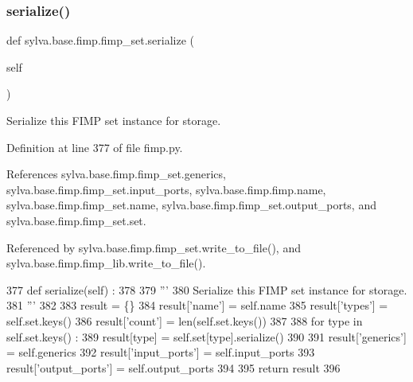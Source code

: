 \subsubsection{\texorpdfstring{serialize()}{serialize()}}
{\footnotesize\ttfamily def sylva.\+base.\+fimp.\+fimp\+\_\+set.\+serialize (\begin{DoxyParamCaption}\item[{}]{self }\end{DoxyParamCaption})}

\begin{DoxyVerb}  Serialize this FIMP set instance for storage.
\end{DoxyVerb}
 

Definition at line 377 of file fimp.\+py.



References sylva.\+base.\+fimp.\+fimp\+\_\+set.\+generics, sylva.\+base.\+fimp.\+fimp\+\_\+set.\+input\+\_\+ports, sylva.\+base.\+fimp.\+fimp.\+name, sylva.\+base.\+fimp.\+fimp\+\_\+set.\+name, sylva.\+base.\+fimp.\+fimp\+\_\+set.\+output\+\_\+ports, and sylva.\+base.\+fimp.\+fimp\+\_\+set.\+set.



Referenced by sylva.\+base.\+fimp.\+fimp\+\_\+set.\+write\+\_\+to\+\_\+file(), and sylva.\+base.\+fimp.\+fimp\+\_\+lib.\+write\+\_\+to\+\_\+file().


\begin{DoxyCode}
377     \textcolor{keyword}{def }serialize(self) :
378 
379       \textcolor{stringliteral}{'''}
380 \textcolor{stringliteral}{        Serialize this FIMP set instance for storage.}
381 \textcolor{stringliteral}{      '''}
382 
383       result = \{\}
384       result[\textcolor{stringliteral}{'name'}] = self.name
385       result[\textcolor{stringliteral}{'types'}] = self.set.keys()
386       result[\textcolor{stringliteral}{'count'}] = len(self.set.keys())
387 
388       \textcolor{keywordflow}{for} type \textcolor{keywordflow}{in} self.set.keys() :
389         result[type] = self.set[type].serialize()
390 
391       result[\textcolor{stringliteral}{'generics'}] = self.generics
392       result[\textcolor{stringliteral}{'input\_ports'}] = self.input\_ports
393       result[\textcolor{stringliteral}{'output\_ports'}] = self.output\_ports
394 
395       \textcolor{keywordflow}{return} result
396 
\end{DoxyCode}
\mbox{\label{classsylva_1_1base_1_1fimp_1_1fimp__set_a080102d68047524f8e1bd07a4da97ca1}} 
